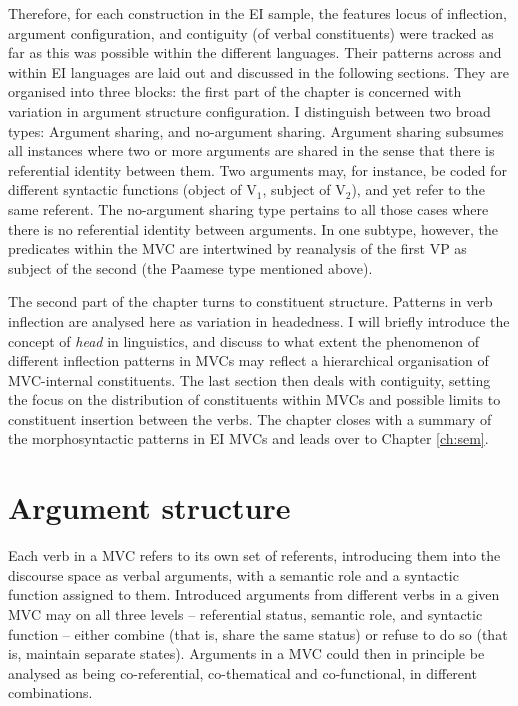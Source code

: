 Therefore, for each construction in the EI sample, the features locus of inflection, argument configuration, and contiguity (of verbal constituents) were tracked as far as this was possible within the different languages. Their patterns across and within EI languages are laid out and discussed in the following sections. They are organised into three blocks: the first part of the chapter is concerned with variation in argument structure configuration. I distinguish between two broad types: Argument sharing, and no-argument sharing. Argument sharing subsumes all instances where two or more arguments are shared in the sense that there is referential identity between them. Two arguments may, for instance, be coded for different syntactic functions (object of V$_1$, subject of V$_2$), and yet refer to the same referent. The no-argument sharing type pertains to all those cases where there is no referential identity between arguments. In one subtype, however, the predicates within the MVC are intertwined by reanalysis of the first VP as subject of the second (the Paamese type mentioned above).

The second part of the chapter turns to constituent structure. Patterns in verb inflection are analysed here as variation in headedness. I will briefly introduce the concept of \textit{head} in linguistics, and discuss to what extent the phenomenon of different inflection patterns in MVCs may reflect a hierarchical organisation of MVC-internal constituents. The last section then deals with contiguity, setting the focus on the distribution of constituents within MVCs and possible limits to constituent insertion between the verbs. The chapter closes with a summary of the morphosyntactic patterns in EI MVCs and leads over to Chapter \ref{ch:sem}.

\section{Argument structure}\label{sec:argumentstructure}

Each verb in a MVC refers to its own set of referents, introducing them into the discourse space as verbal arguments, with a semantic role and a syntactic function assigned to them. Introduced arguments from different verbs in a given MVC may on all three levels -- referential status, semantic role, and syntactic function -- either combine (that is, share the same status) or refuse to do so (that is, maintain separate states). Arguments in a MVC could then in principle be analysed as being co-referential, co-thematical and co-functional, in different combinations. 


